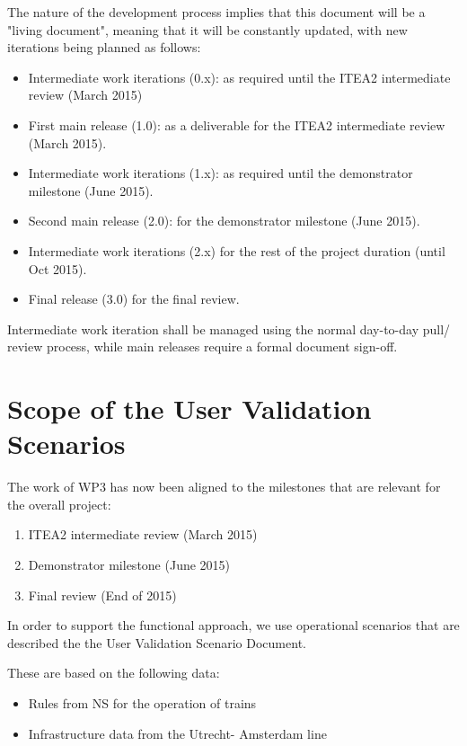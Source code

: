 The nature of the development process implies that this document will be a "living document", meaning that it will be constantly updated, with new iterations being planned as follows:

\begin{itemize}
\item Intermediate work iterations (0.x): as required until the ITEA2 intermediate review (March 2015)

\item First main release (1.0): as a deliverable for the ITEA2 intermediate review (March 2015).

\item Intermediate work iterations (1.x): as required until the demonstrator milestone (June 2015).

\item Second main release (2.0): for the demonstrator milestone (June 2015).

\item Intermediate work iterations (2.x) for the rest of the project duration (until Oct 2015).

\item Final release (3.0) for the final review.
\end{itemize}

Intermediate work iteration shall be managed using the normal day-to-day pull/ review process, while main releases require a formal document sign-off.



\section{Scope of the User Validation Scenarios}

The work of WP3 has now been aligned to the milestones that are relevant for the overall project:
\begin{enumerate}
\item ITEA2 intermediate review (March 2015)
\item Demonstrator milestone (June 2015)
\item Final review (End of 2015)
\end{enumerate}

In order to support the functional approach, we use operational scenarios that are described the the User Validation Scenario Document.

These are based on the following data:
\begin{itemize}
\item Rules from NS for the operation of trains
\item Infrastructure data from the Utrecht- Amsterdam line
\end{itemize}

